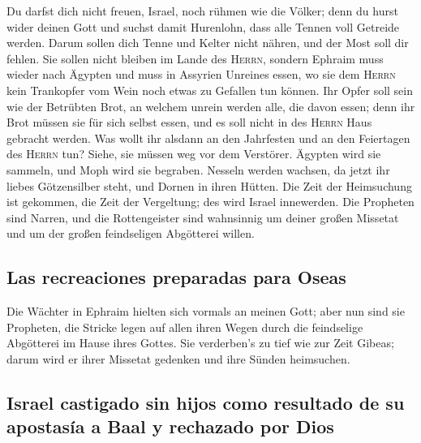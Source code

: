  Du darfst dich nicht freuen, Israel, noch rühmen wie die
Völker; denn du hurst wider deinen Gott und suchst damit Hurenlohn, dass
alle Tennen voll Getreide werden.  Darum sollen dich Tenne
und Kelter nicht nähren, und der Most soll dir fehlen. 
Sie sollen nicht bleiben im Lande des \textsc{Herrn}, sondern Ephraim
muss wieder nach Ägypten und muss in Assyrien Unreines essen,
 wo sie dem \textsc{Herrn} kein Trankopfer vom Wein noch
etwas zu Gefallen tun können. Ihr Opfer soll sein wie der Betrübten
Brot, an welchem unrein werden alle, die davon essen; denn ihr Brot
müssen sie für sich selbst essen, und es soll nicht in des
\textsc{Herrn} Haus gebracht werden.  Was wollt ihr
alsdann an den Jahrfesten und an den Feiertagen des \textsc{Herrn} tun?
 Siehe, sie müssen weg vor dem Verstörer. Ägypten wird sie
sammeln, und Moph wird sie begraben. Nesseln werden wachsen, da jetzt
ihr liebes Götzensilber steht, und Dornen in ihren Hütten.
 Die Zeit der Heimsuchung ist gekommen, die Zeit der
Vergeltung; des wird Israel innewerden. Die Propheten sind Narren, und
die Rottengeister sind wahnsinnig um deiner großen Missetat und um der
großen feindseligen Abgötterei willen.

\hypertarget{las-recreaciones-preparadas-para-oseas}{%
\subsection{Las recreaciones preparadas para
Oseas}\label{las-recreaciones-preparadas-para-oseas}}

 Die Wächter in Ephraim hielten sich vormals an meinen
Gott; aber nun sind sie Propheten, die Stricke legen auf allen ihren
Wegen durch die feindselige Abgötterei im Hause ihres Gottes.
 Sie verderben's zu tief wie zur Zeit Gibeas; darum wird
er ihrer Missetat gedenken und ihre Sünden heimsuchen.

\hypertarget{israel-castigado-sin-hijos-como-resultado-de-su-apostasuxeda-a-baal-y-rechazado-por-dios}{%
\subsection{Israel castigado sin hijos como resultado de su apostasía a
Baal y rechazado por
Dios}\label{israel-castigado-sin-hijos-como-resultado-de-su-apostasuxeda-a-baal-y-rechazado-por-dios}}

